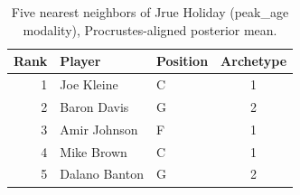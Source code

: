 \begin{table}[htbp]
  \centering\small
  \begin{tabular}{rllc}
    \toprule
    Rank & Player & Position & Archetype \\
    \midrule
    1 & Joe Kleine & C & 1 \\
    2 & Baron Davis & G & 2 \\
    3 & Amir Johnson & F & 1 \\
    4 & Mike Brown & C & 1 \\
    5 & Dalano Banton & G & 2 \\
    \bottomrule
  \end{tabular}
  \caption{Five nearest neighbors of Jrue Holiday (peak_age modality), Procrustes-aligned posterior mean.}
  \label{tab:Jrue_Holiday_neighbors_peak_age}
\end{table}

